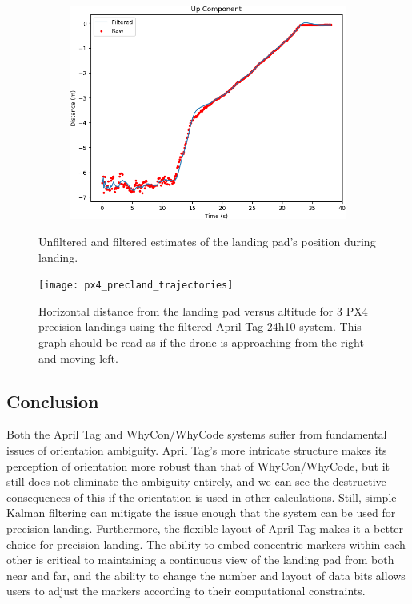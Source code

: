 \begin{figure}
    \begin{subfigure}[b]{0.49\textwidth}
         \centering
         \includegraphics[width=\textwidth]{images/landing_apriltag24h10_up}
    \end{subfigure}
    \caption{Unfiltered and filtered estimates of the landing pad's position during landing.}
    \label{figure:filtered_unfiltered_apriltag_24h10}
\end{figure}

\begin{figure}
    \centering
    \texttt{[image: px4\_precland\_trajectories]}
    \caption{Horizontal distance from the landing pad versus altitude for 3 PX4 precision landings using the filtered April Tag 24h10 system.
    This graph should be read as if the drone is approaching from the right and moving left.}
    \label{figure:px4_precland_trajectories}
\end{figure}

\subsection{Conclusion}

Both the April Tag and WhyCon/WhyCode systems suffer from fundamental issues of orientation ambiguity.
April Tag's more intricate structure makes its perception of orientation more robust than that of WhyCon/WhyCode,
but it still does not eliminate the ambiguity entirely, and we can see the destructive consequences of this if the
orientation is used in other calculations.
Still, simple Kalman filtering can mitigate the issue enough that the system can be used for precision landing.
Furthermore, the flexible layout of April Tag makes it a better choice for precision landing.
The ability to embed concentric markers within each other is critical to maintaining a continuous view of the landing pad
from both near and far,
and the ability to change the number and layout of data bits allows users to adjust the markers according to their computational constraints.